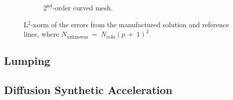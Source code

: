 \documentclass[12pt]{article}
\begin{document}
\begin{figure}[!htb]
\begin{subfigure}[b]{0.6\textwidth}
\caption{$2^\text{nd}$-order curved mesh.}
\label{fig:RZBaileyS4O2R2D22Mesh}
\end{subfigure}
\caption{L$^2$-norm of the errors from the manufactured solution and reference lines, where $N_\text{unknowns}~=~N_\text{cells}(p~+~1)^2$.}
\end{figure}



\subsection{Lumping}

\subsection{Diffusion Synthetic Acceleration}


\pagebreak
\end{document}
